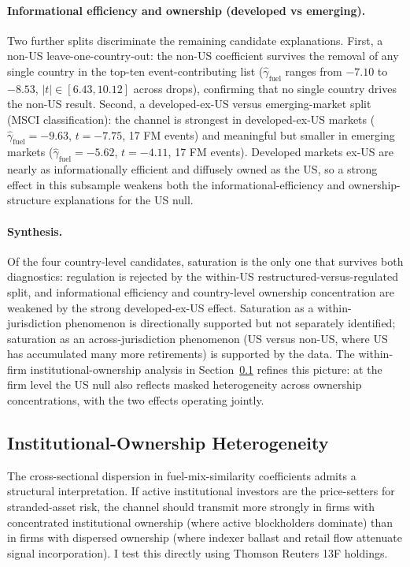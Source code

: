 \documentclass[12pt,a4paper]{article}
\begin{document}
\paragraph{Informational efficiency and ownership (developed vs emerging).}
Two further splits discriminate the remaining candidate explanations. First, a non-US leave-one-country-out: the non-US coefficient survives the removal of any single country in the top-ten event-contributing list ($\hat{\gamma}_{\mathrm{fuel}}$ ranges from $-7.10$ to $-8.53$, $|t| \in [6.43, 10.12]$ across drops), confirming that no single country drives the non-US result. Second, a developed-ex-US versus emerging-market split (MSCI classification): the channel is strongest in developed-ex-US markets ($\hat{\gamma}_{\mathrm{fuel}} = -9.63$, $t = -7.75$, 17 FM events) and meaningful but smaller in emerging markets ($\hat{\gamma}_{\mathrm{fuel}} = -5.62$, $t = -4.11$, 17 FM events). Developed markets ex-US are nearly as informationally efficient and diffusely owned as the US, so a strong effect in this subsample weakens both the informational-efficiency and ownership-structure explanations for the US null.

\paragraph{Synthesis.}
Of the four country-level candidates, saturation is the only one that survives both diagnostics: regulation is rejected by the within-US restructured-versus-regulated split, and informational efficiency and country-level ownership concentration are weakened by the strong developed-ex-US effect. Saturation as a within-jurisdiction phenomenon is directionally supported but not separately identified; saturation as an across-jurisdiction phenomenon (US versus non-US, where US has accumulated many more retirements) is supported by the data. The within-firm institutional-ownership analysis in Section~\ref{sec:inst_heterogeneity} refines this picture: at the firm level the US null also reflects masked heterogeneity across ownership concentrations, with the two effects operating jointly.


\subsection{Institutional-Ownership Heterogeneity}\label{sec:inst_heterogeneity}

The cross-sectional dispersion in fuel-mix-similarity coefficients admits a structural interpretation. If active institutional investors are the price-setters for stranded-asset risk, the channel should transmit more strongly in firms with concentrated institutional ownership (where active blockholders dominate) than in firms with dispersed ownership (where indexer ballast and retail flow attenuate signal incorporation). I test this directly using Thomson Reuters 13F holdings.
\end{document}
